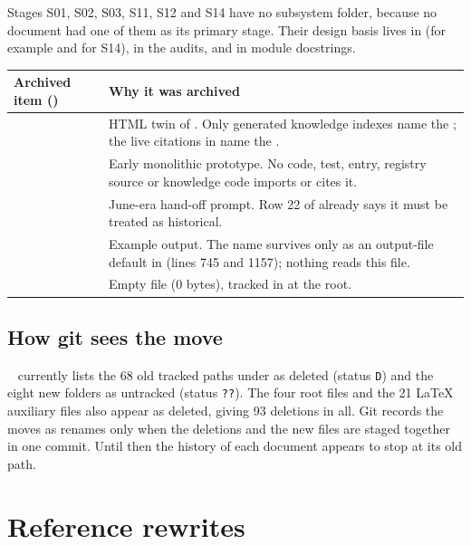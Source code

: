 Stages S01, S02, S03, S11, S12 and S14 have no subsystem folder, because no document had one of them as its primary stage. Their design basis lives in  (for example  and  for S14), in the audits, and in module docstrings.

{\small
\begin{longtable}{P{4.6cm}P{10.8cm}}
\toprule
Archived item () & Why it was archived \\
\midrule
\endhead
{} & HTML twin of . Only generated knowledge indexes name the ; the live citations in  name the . \\
 & Early monolithic prototype. No code, test,  entry, registry source or knowledge code imports or cites it. \\
 & June-era hand-off prompt. Row 22 of  already says it must be treated as historical. \\
 & Example output. The name survives only as an output-file default in  (lines 745 and 1157); nothing reads this file. \\
 & Empty file (0 bytes), tracked in  at the root. \\
\bottomrule
\end{longtable}}

\subsection{How git sees the move}
~ currently lists the 68 old tracked paths under  as deleted (status \texttt{D}) and the eight new folders as untracked (status \texttt{??}). The four root files and the 21 LaTeX auxiliary files also appear as deleted, giving 93 deletions in all. Git records the moves as renames only when the deletions and the new files are staged together in one commit. Until then the history of each document appears to stop at its old path.

\section{Reference rewrites}\label{sec:cl-refs}

